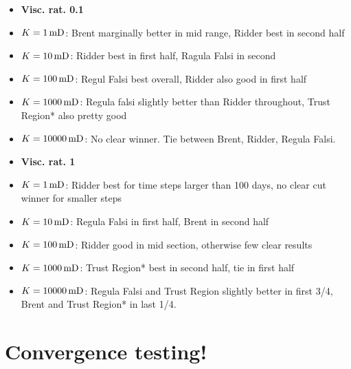 \documentclass[a4paper,12pt]{report}
\begin{document}
\begin{itemize}
\item \textbf{Visc. rat. 0.1}
\item $K = \unit[1]{mD}$: Brent marginally better in mid range, Ridder best in second half
\item $K = \unit[10]{mD}$: Ridder best in first half, Ragula Falsi in second
\item $K = \unit[100]{mD}$: Regul Falsi best overall, Ridder also good in first half
\item $K = \unit[1000]{mD}$: Regula falsi slightly better than Ridder throughout, Trust Region* also pretty good
\item $K = \unit[10000]{mD}$: No clear winner. Tie between Brent, Ridder, Regula Falsi.
\end{itemize}

\begin{itemize}
\item \textbf{Visc. rat. 1}
\item $K = \unit[1]{mD}$: Ridder best for time steps larger than 100 days, no clear cut winner for smaller steps
\item $K = \unit[10]{mD}$: Regula Falsi in first half, Brent in second half
\item $K = \unit[100]{mD}$: Ridder good in mid section, otherwise few clear results
\item $K = \unit[1000]{mD}$: Trust Region* best in second half, tie in first half
\item $K = \unit[10000]{mD}$: Regula Falsi and Trust Region slightly better in first 3/4, Brent and Trust Region* in last 1/4.
\end{itemize}

\section{Convergence testing!}
\end{document}

